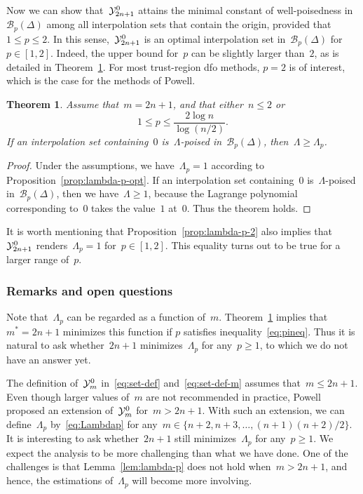 \documentclass{article}
\numberwithin{equation}{section}
\theoremstyle{definition}
\theoremstyle{plain}
\newtheorem{theorem}{Theorem}[section]
\theoremstyle{remark}
\newcommand*{\xpt}[1][]{\mathcal{Y}\ifblank{#1}{}{^{#1}}}
\begin{document}
Now we can show that~$\xpt[0]_{2n+1}$ attains the minimal constant of well-poisedness in~$\mathcal{B}_p(\Delta)$ among all interpolation sets that contain the origin, provided that~$1 \le p\le 2$.
In this sense,~$\xpt[0]_{2n + 1}$ is an optimal interpolation set in~$\mathcal{B}_p(\Delta)$ for~$p \in [1, 2]$.
Indeed, the upper bound for~$p$ can be slightly larger than~$2$, as is detailed in Theorem~\ref{thm:optimset}.
For most trust-region \gls{dfo} methods, $p=2$ is of interest, which is the case for the methods of Powell.
\begin{theorem}
    \label{thm:optimset}
    Assume that~$m=2n+1$, and that either~$n\le 2$ or
    \begin{equation}
        \label{eq:pineq}
        1 \le p \le \frac{2\log n}{\log (n/2)}.
    \end{equation}
    If an interpolation set containing~$0$ is~$\Lambda$-poised in~$\mathcal{B}_p(\Delta)$, then~$\Lambda \ge \Lambda_p$.
\end{theorem}

\begin{proof}
    Under the assumptions, we have~$\Lambda_p = 1$ according to Proposition~\ref{prop:lambda-p-opt}.
    If an interpolation set containing~$0$ is~$\Lambda$-poised in~$\mathcal{B}_p(\Delta)$, then we
    have~$\Lambda \ge 1$, because the Lagrange polynomial corresponding to~$0$ takes the value~$1$ at~$0$.
    Thus the theorem holds.
\end{proof}
It is worth mentioning that Proposition~\ref{prop:lambda-p-2} also implies that~$\xpt[0]_{2n+1}$ renders~$\Lambda_p = 1$ for~$p \in [1, 2]$.
This equality turns out to be true for a larger range of~$p$.



\subsubsection{Remarks and open questions}

Note that~$\Lambda_p$ can be regarded as a function of~$m$. Theorem~\ref{thm:optimset} implies that~$m^\ast = 2n+1$ minimizes this function if $p$ satisfies inequality~\eqref{eq:pineq}.
Thus it is natural to ask whether~$2n+1$ minimizes~$\Lambda_p$ for any~$p \ge 1$, to which we do not have an answer yet.

The definition of~$\xpt[0]_m$ in~\eqref{eq:set-def} and~\eqref{eq:set-def-m} assumes that~$m \le 2n + 1$.
Even though larger values of~$m$ are not recommended in practice, Powell~\cite{Powell_2006} proposed
an extension of~$\xpt[0]_m$ for~$m>2n+1$.
With such an extension, we can define~$\Lambda_p$ by~\eqref{eq:Lambdap} for any~$m \in \{n+2, n+3, \dots, (n+1)(n+2)/2\}$.
It is interesting to ask whether~$2n + 1$ still minimizes~$\Lambda_p$ for any~$p \ge 1$. %
We expect the analysis to be more challenging than what we have done.
One of the challenges is that Lemma~\ref{lem:lambda-p} does not hold when~$m > 2n + 1$, and hence, the estimations of~$\Lambda_p$ will become more involving.
\end{document}
